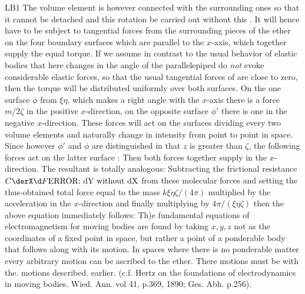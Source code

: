 \begin{paper}{LB1}
The volume element is however connected with the surrounding ones so that it cannot be detached and this rotation  be carried out without this . It will hence have to be subject to tangential forces from the surrounding pieces of the ether on the four boundary surfaces which are parallel to the $x$-axis, which together supply the equal torque. If we assume in contrast to the usual behavior of elastic bodies that here changes in the angle of the parallelepiped do \textit{not} evoke considerable elastic forces, so that the usual tangential forces of  are close to zero, then the torque will be distributed uniformly over both surfaces. On the one surface $\phi$ from $\xi\eta$, which makes a right angle with the $x$-axis there is a force $m/2\zeta$ in the positive $x$-direction, on the opposite surface $\phi'$ there is one in the negative $x$-direction. These forces will act on the surfaces dividing every two volume elements and naturally change in intensity from point to point in space. Since however $\phi'$ and $\phi$ are distinguished in that $z$ is greater than $\zeta$, the following forces act on the latter surface :
Then both forces together supply
in the $x$-direction. The resultant is totally analogous:
Subtracting the frictional resistance $C\ddt{F}$ from these molecular forces and setting the thus-obtained total force equal to the mass $k\xi\eta\zeta/(4\pi)$ multiplied by the acceleration in the $x$-direction and finally multiplying by $4\pi/(\xi\eta\zeta)$ then the above equation immediately follows:
Th)e fundamental equations of electromagnetism for moving bodies are found by taking $x,y,z$ not as the coordinates of a fixed point in space, but rather a point of a ponderable body that follows along with its motion. In spaces where there is no ponderable matter every arbitrary  motion can be ascribed to the ether. There motions must be  with the. motions described. earlier. (c.f. Hertz on the foundations of electrodynamics in moving bodies. Wied. Ann. vol 41, p.369, 1890; Ges. Abh. p.256).


\end{paper}
